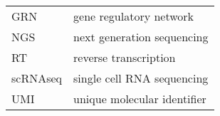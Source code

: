 
\begin{tabular}{@{}ll@{}}
  GRN & gene regulatory network \\
  NGS & next generation sequencing \\
  RT & reverse transcription \\
  scRNAseq & single cell RNA sequencing \\
  UMI & unique molecular identifier \\
\end{tabular}

